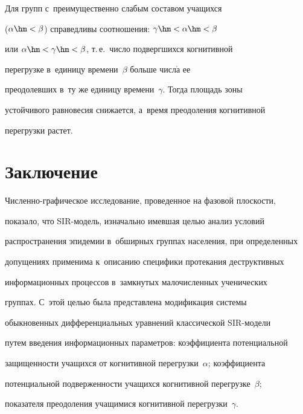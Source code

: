   


  Для групп с~преимущественно слабым со\-ста\-вом учащихся 


($\alpha\hm<\beta$) справедливы соотношения: $\gamma\hm< \alpha\hm< \beta$ 


или $\alpha\hm< \gamma\hm< \beta$, т.\,е.\ число подвергшихся когнитивной 


пе\-ре\-гру\-зке в~единицу времени~$\beta$ больше числ$\acute{\mbox{а}}$ ее 


преодолевших в~ту же единицу времени~$\gamma$. Тогда площадь зоны 


устойчивого равновесия снижается, а~время преодоления когнитивной 


пе\-ре\-груз\-ки растет. 


  





\section{Заключение}





  Численно-графическое исследование, проведенное на фазовой плоскости, 


показало, что SIR-мо\-дель, изначально имевшая целью анализ условий 


распространения эпидемии в~обширных группах населения, при определенных 


допущениях применима к~описанию специфики протекания деструктивных 


информационных процессов в~замк\-ну\-тых ма\-ло\-чис\-лен\-ных ученических 


группах. С~этой целью была представлена модификация сис\-те\-мы 


обыкновенных дифференциальных урав\-не\-ний классической SIR-мо\-де\-ли 


путем введения информационных па\-ра\-мет\-ров: коэффициента потенциальной 


защищенности учащихся от когнитивной пе\-ре\-груз\-ки~$\alpha$; коэффициента 


потенциальной под\-вер\-жен\-ности учащихся когнитивной перегрузке~$\beta$; 


показателя преодоления учащимися когнитивной перегрузки~$\gamma$. 


{





}


